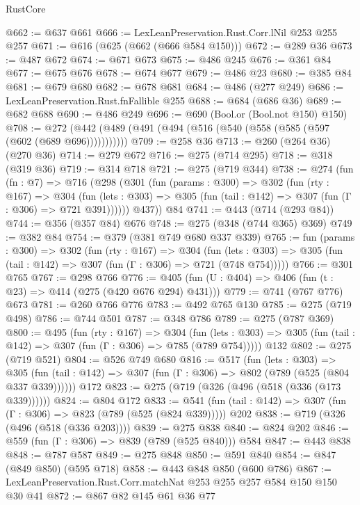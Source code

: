 \begin{lexlean}{RustCore}
\begin{coremodule}
@662 := @637 @661
@666 := LexLeanPreservation.Rust.Corr.lNil @253 @255 @257
@671 := @616 (@625 (@662 (@666 @584 @150)))
@672 := @289 @36
@673 := @487 @672
@674 := @671 @673
@675 := @486 @245
@676 := @361 @84
@677 := @675 @676
@678 := @674 @677
@679 := @486 @23
@680 := @385 @84
@681 := @679 @680
@682 := @678 @681
@684 := @486 (@277 @249)
@686 := LexLeanPreservation.Rust.fnFallible @255
@688 := @684 (@686 @36)
@689 := @682 @688
@690 := @486 @249
@696 := @690 (Bool.or (Bool.not @150) @150)
@708 := @272 (@442 (@489 (@491 (@494 (@516 (@540 (@558 (@585 (@597 (@602 (@689 @696)))))))))))
@709 := @258 @36
@713 := @260 (@264 @36) (@270 @36)
@714 := @279 @672
@716 := @275 (@714 @295)
@718 := @318 (@319 @36)
@719 := @314 @718
@721 := @275 (@719 @344)
@738 := @274
    (fun (fn : @7) =>
    @716
      (@298
        (@301
          (fun (params : @300) =>
          @302
            (fun (rty : @167) =>
            @304
              (fun (lets : @303) =>
              @305 (fun (tail : @142) => @307 (fun (Γ : @306) => @721 @391))))))
        @437))
    @84
@741 := @443 (@714 (@293 @84))
@744 := @356 (@357 @84) @676
@748 := @275 (@348 (@744 @365) @369)
@749 := @382 @84
@754 := @379 (@381 @749 @680 @337 @339)
@765 := fun (params : @300) =>
  @302
    (fun (rty : @167) =>
    @304
      (fun (lets : @303) => @305 (fun (tail : @142) => @307 (fun (Γ : @306) => @721 (@748 @754)))))
@766 := @301 @765
@767 := @298 @766
@776 := @405 (fun (U : @404) => @406 (fun (t : @23) => @414 (@275 (@420 @676 @294) @431)))
@779 := @741 (@767 @776) @673
@781 := @260 @766 @776
@783 := @492 @765 @130
@785 := @275 (@719 @498)
@786 := @744 @501
@787 := @348 @786
@789 := @275 (@787 @369)
@800 := @495
    (fun (rty : @167) =>
    @304
      (fun (lets : @303) => @305 (fun (tail : @142) => @307 (fun (Γ : @306) => @785 (@789 @754)))))
    @132
@802 := @275 (@719 @521)
@804 := @526 @749 @680
@816 := @517
    (fun (lets : @303) =>
    @305 (fun (tail : @142) => @307 (fun (Γ : @306) => @802 (@789 (@525 (@804 @337 @339))))))
    @172
@823 := @275 (@719 (@326 (@496 (@518 (@336 (@173 @339))))))
@824 := @804 @172
@833 := @541 (fun (tail : @142) => @307 (fun (Γ : @306) => @823 (@789 (@525 (@824 @339))))) @202
@838 := @719 (@326 (@496 (@518 (@336 @203))))
@839 := @275 @838
@840 := @824 @202
@846 := @559 (fun (Γ : @306) => @839 (@789 (@525 @840))) @584
@847 := @443 @838
@848 := @787 @587
@849 := @275 @848
@850 := @591 @840
@854 := @847 (@849 @850) (@595 @718)
@858 := @443 @848 @850 (@600 @786)
@867 := LexLeanPreservation.Rust.Corr.matchNat @253 @255 @257 @584 @150 @150 @30 @41
@872 := @867 @82 @145 @61 @36 @77

\end{coremodule}
\end{lexlean}
